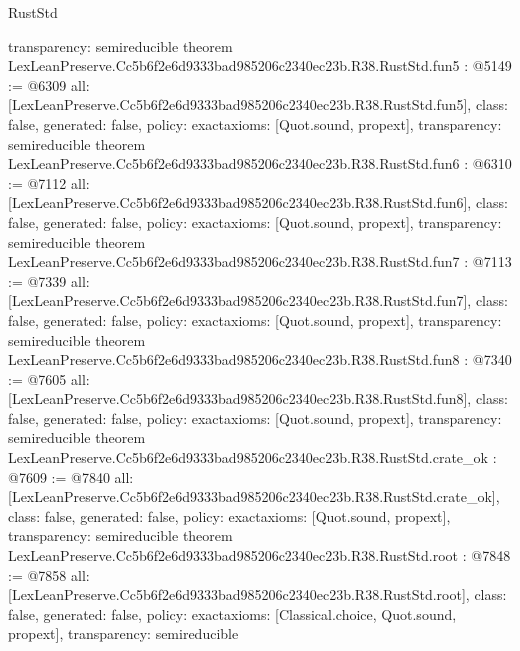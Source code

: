 \begin{lexlean}{RustStd}
\begin{coremodule}
{  transparency: semireducible
}
theorem LexLeanPreserve.Cc5b6f2e6d9333bad985206c2340ec23b.R38.RustStd.fun5 : @5149 := @6309 {
  all: [LexLeanPreserve.Cc5b6f2e6d9333bad985206c2340ec23b.R38.RustStd.fun5],
  class: false,
  generated: false,
  policy: exact{axioms: [Quot.sound, propext]},
  transparency: semireducible
}
theorem LexLeanPreserve.Cc5b6f2e6d9333bad985206c2340ec23b.R38.RustStd.fun6 : @6310 := @7112 {
  all: [LexLeanPreserve.Cc5b6f2e6d9333bad985206c2340ec23b.R38.RustStd.fun6],
  class: false,
  generated: false,
  policy: exact{axioms: [Quot.sound, propext]},
  transparency: semireducible
}
theorem LexLeanPreserve.Cc5b6f2e6d9333bad985206c2340ec23b.R38.RustStd.fun7 : @7113 := @7339 {
  all: [LexLeanPreserve.Cc5b6f2e6d9333bad985206c2340ec23b.R38.RustStd.fun7],
  class: false,
  generated: false,
  policy: exact{axioms: [Quot.sound, propext]},
  transparency: semireducible
}
theorem LexLeanPreserve.Cc5b6f2e6d9333bad985206c2340ec23b.R38.RustStd.fun8 : @7340 := @7605 {
  all: [LexLeanPreserve.Cc5b6f2e6d9333bad985206c2340ec23b.R38.RustStd.fun8],
  class: false,
  generated: false,
  policy: exact{axioms: [Quot.sound, propext]},
  transparency: semireducible
}
theorem LexLeanPreserve.Cc5b6f2e6d9333bad985206c2340ec23b.R38.RustStd.crate_ok : @7609 := @7840 {
  all: [LexLeanPreserve.Cc5b6f2e6d9333bad985206c2340ec23b.R38.RustStd.crate_ok],
  class: false,
  generated: false,
  policy: exact{axioms: [Quot.sound, propext]},
  transparency: semireducible
}
theorem LexLeanPreserve.Cc5b6f2e6d9333bad985206c2340ec23b.R38.RustStd.root : @7848 := @7858 {
  all: [LexLeanPreserve.Cc5b6f2e6d9333bad985206c2340ec23b.R38.RustStd.root],
  class: false,
  generated: false,
  policy: exact{axioms: [Classical.choice, Quot.sound, propext]},
  transparency: semireducible
}


\end{coremodule}
\end{lexlean}
